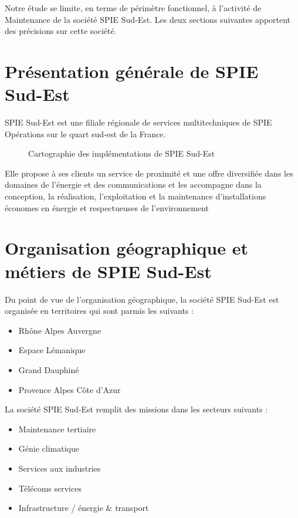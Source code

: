 
Notre étude se limite, en terme de périmètre fonctionnel, à l'activité de Maintenance de la société SPIE Sud-Est. Les deux sections suivantes apportent des précisions sur cette société.

\section{Présentation générale de SPIE Sud-Est}

SPIE Sud-Est est une filiale régionale de services multitechniques de SPIE Opérations sur le quart sud-est de la France.

\begin{figure}[H]
    \label{fig-LABEL-DE-LA-FIGURE}
    \noindent{}
    \caption{Cartographie des implémentations de SPIE Sud-Est}
\end{figure}

Elle propose à ses clients un service de proximité et une offre diversifiée dans les domaines de l'énergie et des communications et les accompagne dans la conception, la réalisation, l’exploitation et la maintenance d’installations économes en énergie et respectueuses de l’environnement

\section{Organisation géographique et métiers de SPIE Sud-Est}

Du point de vue de l'organisation géographique, la société SPIE Sud-Est est organisée en territoires qui sont parmis les suivants : \\
\begin{itemize}
    \item[\textbullet] Rhône Alpes Auvergne
    \item[\textbullet] Espace Lémanique
    \item[\textbullet] Grand Dauphiné
    \item[\textbullet] Provence Alpes Côte d'Azur\\
\end{itemize}
    
La société SPIE Sud-Est remplit des missions dans les secteurs suivants :  \\
\begin{itemize}
    \item[\textbullet] Maintenance tertiaire
    \item[\textbullet] Génie climatique
    \item[\textbullet] Services aux industries
    \item[\textbullet] Télécoms services
    \item[\textbullet] Infrastructure / énergie \& transport
\end{itemize}
